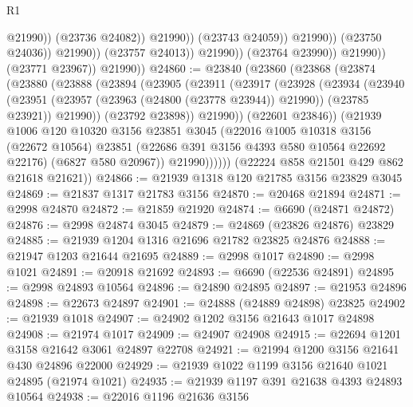 \begin{lexlean}{R1}
\begin{coremodule}
                                            @21990))
                                        (@23736 @24082))
                                      @21990))
                                  (@23743 @24059))
                                @21990))
                            (@23750 @24036))
                          @21990))
                      (@23757 @24013))
                    @21990))
                (@23764 @23990))
              @21990))
          (@23771 @23967))
        @21990))
@24860 := @23840
    (@23860
      (@23868
        (@23874
          (@23880
            (@23888
              (@23894
                (@23905
                  (@23911
                    (@23917
                      (@23928
                        (@23934
                          (@23940
                            (@23951
                              (@23957 (@23963 (@24800 (@23778 @23944)) @21990))
                              (@23785 @23921))
                            @21990))
                        (@23792 @23898))
                      @21990))
                  (@22601 @23846))
                (@21939
                  @1006
                  @120
                  @10320
                  @3156
                  @23851
                  @3045
                  (@22016
                    @1005
                    @10318
                    @3156
                    (@22672 @10564)
                    @23851
                    (@22686 @391 @3156 @4393 @580 @10564 @22692 @22176)
                    (@6827 @580 @20967))
                  @21990))))))
      (@22224 @858 @21501 @429 @862 @21618 @21621))
@24866 := @21939 @1318 @120 @21785 @3156 @23829 @3045
@24869 := @21837 @1317 @21783 @3156
@24870 := @20468 @21894
@24871 := @2998 @24870
@24872 := @21859 @21920
@24874 := @6690 (@24871 @24872)
@24876 := @2998 @24874 @3045
@24879 := @24869 (@23826 @24876) @23829
@24885 := @21939 @1204 @1316 @21696 @21782 @23825 @24876
@24888 := @21947 @1203 @21644 @21695
@24889 := @2998 @1017
@24890 := @2998 @1021
@24891 := @20918 @21692
@24893 := @6690 (@22536 @24891)
@24895 := @2998 @24893 @10564
@24896 := @24890 @24895
@24897 := @21953 @24896
@24898 := @22673 @24897
@24901 := @24888 (@24889 @24898) @23825
@24902 := @21939 @1018
@24907 := @24902 @1202 @3156 @21643 @1017 @24898
@24908 := @21974 @1017
@24909 := @24907 @24908
@24915 := @22694 @1201 @3158 @21642 @3061 @24897 @22708
@24921 := @21994 @1200 @3156 @21641 @430 @24896 @22000
@24929 := @21939 @1022 @1199 @3156 @21640 @1021 @24895 (@21974 @1021)
@24935 := @21939 @1197 @391 @21638 @4393 @24893 @10564
@24938 := @22016 @1196 @21636 @3156

\end{coremodule}
\end{lexlean}
